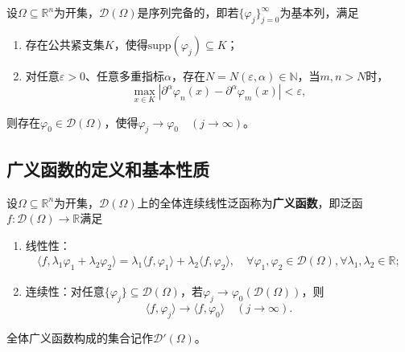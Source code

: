 \documentclass[../../main.tex]{subfiles}%
\begin{document}
\begin{proposition}
设$\Omega\subseteq\mathbb{R}^n$为开集，$\mathscr{D}(\Omega)$是序列完备的，即若$\{\varphi_j\}_{j=0}^\infty$为基本列，满足
\begin{enumerate}[(1)]
\item 存在公共紧支集$K$，使得$\mathrm{supp}(\varphi_j)\subseteq K$；
\item 对任意$\varepsilon>0$、任意多重指标$\alpha$，存在$N=N(\varepsilon,\alpha)\in\mathbb{N}$，当$m,n>N$时，
$$\max\limits_{x\in K}|\partial^\alpha\varphi_n(x)-\partial^\alpha\varphi_m(x)|<\varepsilon,$$
\end{enumerate}
则存在$\varphi_0\in\mathscr{D}(\Omega)$，使得$\varphi_j\to\varphi_0\quad(j\to\infty)$。
\end{proposition}


\subsection{广义函数的定义和基本性质}

\begin{definition}
设$\Omega\subseteq\mathbb{R}^n$为开集，$\mathscr{D}(\Omega)$上的全体连续线性泛函称为\textbf{广义函数}，即泛函$f:\mathscr{D}(\Omega)\to\mathbb{R}$满足
\begin{enumerate}[(1)]
\item 线性性：
\begin{align*}
\langle f,\lambda_1\varphi_1+\lambda_2\varphi_2\rangle=\lambda_1\langle f,\varphi_1\rangle+\lambda_2\langle f,\varphi_2\rangle,\quad\forall\varphi_1,\varphi_2\in\mathscr{D}(\Omega),\forall\lambda_1,\lambda_2\in\mathbb{R};
\end{align*}
\item 连续性：对任意$\{\varphi_j\}\subseteq\mathscr{D}(\Omega)$，若$\varphi_j\to\varphi_0(\mathscr{D}(\Omega))$，则
$$\langle f,\varphi_j\rangle\to\langle f,\varphi_0\rangle\quad(j\to\infty).$$
\end{enumerate}
全体广义函数构成的集合记作$\mathscr{D}'(\Omega)$。
\end{definition}
\end{document}
